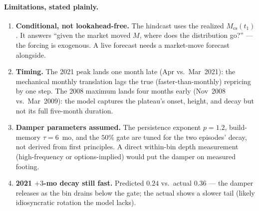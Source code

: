 \documentclass[11pt,a4paper]{article}
\begin{document}
\paragraph{Limitations, stated plainly.}
\begin{enumerate}
\item \textbf{Conditional, not lookahead-free.} The hindcast uses the
  realized $M_{\mathrm{cs}}(t_1)$.  It answers ``given the market moved $M$,
  where does the distribution go?'' --- the forcing is exogenous.  A live
  forecast needs a market-move forecast alongside.
\item \textbf{Timing.} The 2021 peak lands one month late (Apr vs.\
  Mar~2021): the mechanical monthly translation lags the true
  (faster-than-monthly) repricing by one step.  The 2008 maximum lands four
  months early (Nov~2008 vs.\ Mar~2009): the model captures the plateau's
  onset, height, and decay but not its full five-month duration.
\item \textbf{Damper parameters assumed.} The persistence exponent
  $p=1.2$, build-memory $\tau=6$~mo, and the $50\%$ gate are tuned for the
  two episodes' decay, not derived from first principles.  A direct
  within-bin depth measurement (high-frequency or options-implied) would
  put the damper on measured footing.
\item \textbf{2021 $+3$-mo decay still fast.} Predicted $0.24$ vs.\ actual
  $0.36$ --- the damper releases as the bin drains below the gate; the
  actual shows a slower tail (likely idiosyncratic rotation the model
  lacks).
\end{enumerate}

\end{document}
